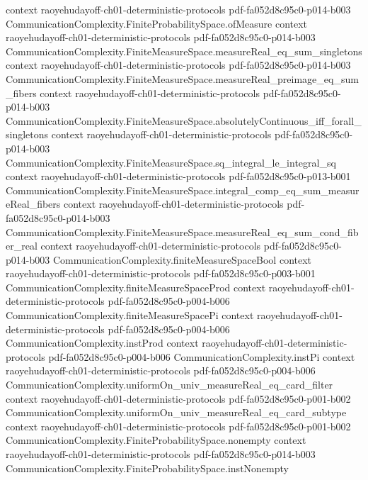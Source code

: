 \begin{theorem}
  {context}
  {raoyehudayoff-ch01-deterministic-protocols}
  {pdf-fa052d8c95c0-p014-b003}
\proofstep
  {CommunicationComplexity.FiniteProbabilitySpace.ofMeasure}
  {context}
  {raoyehudayoff-ch01-deterministic-protocols}
  {pdf-fa052d8c95c0-p014-b003}
\proofstep
  {CommunicationComplexity.FiniteMeasureSpace.measureReal_eq_sum_singletons}
  {context}
  {raoyehudayoff-ch01-deterministic-protocols}
  {pdf-fa052d8c95c0-p014-b003}
\proofstep
  {CommunicationComplexity.FiniteMeasureSpace.measureReal_preimage_eq_sum_fibers}
  {context}
  {raoyehudayoff-ch01-deterministic-protocols}
  {pdf-fa052d8c95c0-p014-b003}
\proofstep
  {CommunicationComplexity.FiniteMeasureSpace.absolutelyContinuous_iff_forall_singletons}
  {context}
  {raoyehudayoff-ch01-deterministic-protocols}
  {pdf-fa052d8c95c0-p014-b003}
\proofstep
  {CommunicationComplexity.FiniteMeasureSpace.sq_integral_le_integral_sq}
  {context}
  {raoyehudayoff-ch01-deterministic-protocols}
  {pdf-fa052d8c95c0-p013-b001}
\proofstep
  {CommunicationComplexity.FiniteMeasureSpace.integral_comp_eq_sum_measureReal_fibers}
  {context}
  {raoyehudayoff-ch01-deterministic-protocols}
  {pdf-fa052d8c95c0-p014-b003}
\proofstep
  {CommunicationComplexity.FiniteMeasureSpace.measureReal_eq_sum_cond_fiber_real}
  {context}
  {raoyehudayoff-ch01-deterministic-protocols}
  {pdf-fa052d8c95c0-p014-b003}
\proofstep
  {CommunicationComplexity.finiteMeasureSpaceBool}
  {context}
  {raoyehudayoff-ch01-deterministic-protocols}
  {pdf-fa052d8c95c0-p003-b001}
\proofstep
  {CommunicationComplexity.finiteMeasureSpaceProd}
  {context}
  {raoyehudayoff-ch01-deterministic-protocols}
  {pdf-fa052d8c95c0-p004-b006}
\proofstep
  {CommunicationComplexity.finiteMeasureSpacePi}
  {context}
  {raoyehudayoff-ch01-deterministic-protocols}
  {pdf-fa052d8c95c0-p004-b006}
\proofstep
  {CommunicationComplexity.instProd}
  {context}
  {raoyehudayoff-ch01-deterministic-protocols}
  {pdf-fa052d8c95c0-p004-b006}
\proofstep
  {CommunicationComplexity.instPi}
  {context}
  {raoyehudayoff-ch01-deterministic-protocols}
  {pdf-fa052d8c95c0-p004-b006}
\proofstep
  {CommunicationComplexity.uniformOn_univ_measureReal_eq_card_filter}
  {context}
  {raoyehudayoff-ch01-deterministic-protocols}
  {pdf-fa052d8c95c0-p001-b002}
\proofstep
  {CommunicationComplexity.uniformOn_univ_measureReal_eq_card_subtype}
  {context}
  {raoyehudayoff-ch01-deterministic-protocols}
  {pdf-fa052d8c95c0-p001-b002}
\proofstep
  {CommunicationComplexity.FiniteProbabilitySpace.nonempty}
  {context}
  {raoyehudayoff-ch01-deterministic-protocols}
  {pdf-fa052d8c95c0-p014-b003}
\proofstep
  {CommunicationComplexity.FiniteProbabilitySpace.instNonempty}

\end{theorem}
